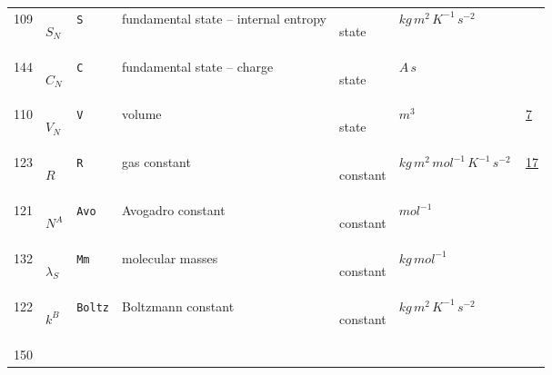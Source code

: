 \begin{longtable}{|p{1cm}|p{2.5cm}|p{4.5cm}|p{8cm}|p{3.0cm}|p{3cm}|p{1cm}|}
            109
             & \hypertarget{"v:109"}{ $ {S}{_{N}} $}
             & \verb|S|
             & fundamental state -- internal entropy
             & \begin{lay}state \end{lay}
             & $ kg \,m^{2} \,K^{-1} \,s^{-2} \, $
             & \\
            144
             & \hypertarget{"v:144"}{ $ {C}{_{N}} $}
             & \verb|C|
             & fundamental state -- charge
             & \begin{lay}state \end{lay}
             & $ A \,s \, $
             & \\
            110
             & \hypertarget{"v:110"}{ $ {V}{_{N}} $}
             & \verb|V|
             & volume
             & \begin{lay}state \end{lay}
             & $ m^{3} \, $
             &                 \hyperlink{"e:7"}{ 7 }
                 \\
            123
             & \hypertarget{"v:123"}{ $ {R}{_{}} $}
             & \verb|R|
             & gas constant
             & \begin{lay}constant \end{lay}
             & $ kg \,m^{2} \,mol^{-1} \,K^{-1} \,s^{-2} \, $
             &                 \hyperlink{"e:17"}{ 17 }
                 \\
            121
             & \hypertarget{"v:121"}{ $ {{N^A}}{_{}} $}
             & \verb|Avo|
             & Avogadro constant
             & \begin{lay}constant \end{lay}
             & $ mol^{-1} \, $
             & \\
            132
             & \hypertarget{"v:132"}{ $ {{\lambda}}{_{S}} $}
             & \verb|Mm|
             & molecular masses
             & \begin{lay}constant \end{lay}
             & $ kg \,mol^{-1} \, $
             & \\
            122
             & \hypertarget{"v:122"}{ $ {{k^B}}{_{}} $}
             & \verb|Boltz|
             & Boltzmann constant
             & \begin{lay}constant \end{lay}
             & $ kg \,m^{2} \,K^{-1} \,s^{-2} \, $
             & \\
            150

\end{longtable}
